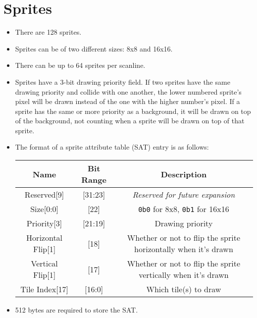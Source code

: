 \documentclass{article}
\begin{document}
\section{Sprites}
	\begin{itemize}
	\item There are 128 sprites.

	\item Sprites can be of two different sizes:  8x8 and 16x16.

	\item There can be up to 64 sprites per scanline.

	\item Sprites have a 3-bit drawing priority field.  If two sprites have
	the same drawing priority and collide with one another, the lower
	numbered sprite's pixel will be drawn instead of the one with the higher
	number's pixel.  If a sprite has the same or more priority as a
	background, it will be drawn on top of the background, not counting
	when a sprite will be drawn on top of that sprite.

	\item The format of a sprite attribute table (SAT) entry is as follows:
		\begin{table}[H]
			\begin{center}
				\begin{tabular}{|c|c|c|}
					\hline
					\textbf{Name} & \textbf{Bit Range} 
						& \textbf{Description}\\
					\hline
					Reserved[9] & [31:23]
						& \textit{Reserved for future expansion}\\
					Size[0:0] & [22]
						& \texttt{0b0} for 8x8, \texttt{0b1} for 16x16 \\
					Priority[3] & [21:19]
						& Drawing priority\\
					Horizontal Flip[1] & [18]
						& Whether or not to flip the sprite horizontally
						when it's drawn\\
					Vertical Flip[1] & [17]
						& Whether or not to flip the sprite vertically
						when it's drawn\\
					Tile Index[17] & [16:0]
						& Which tile(s) to draw\\
					\hline
				\end{tabular}
			\end{center}
		\end{table}

	\item 512 bytes are required to store the SAT.
	\end{itemize}
	\newpage
\end{document}
